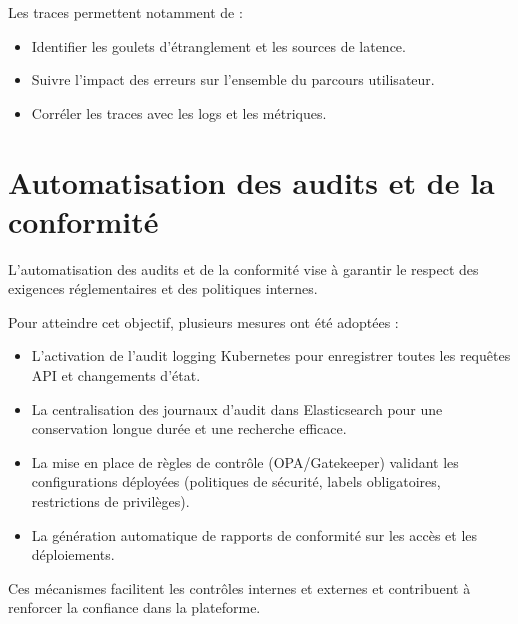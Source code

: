 Les traces permettent notamment de :
\begin{itemize}
	\item Identifier les goulets d’étranglement et les sources de latence.
	\item Suivre l’impact des erreurs sur l’ensemble du parcours utilisateur.
	\item Corréler les traces avec les logs et les métriques.
\end{itemize}

\section{Automatisation des audits et de la conformité}

L’automatisation des audits et de la conformité vise à garantir le respect des exigences réglementaires et des politiques internes.

Pour atteindre cet objectif, plusieurs mesures ont été adoptées :
\begin{itemize}
	\item L’activation de l’audit logging Kubernetes pour enregistrer toutes les requêtes API et changements d’état.
	\item La centralisation des journaux d’audit dans Elasticsearch pour une conservation longue durée et une recherche efficace.
	\item La mise en place de règles de contrôle (OPA/Gatekeeper) validant les configurations déployées (politiques de sécurité, labels obligatoires, restrictions de privilèges).
	\item La génération automatique de rapports de conformité sur les accès et les déploiements.
\end{itemize}

Ces mécanismes facilitent les contrôles internes et externes et contribuent à renforcer la confiance dans la plateforme.